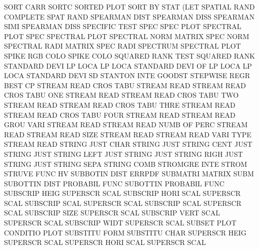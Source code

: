 SORT     CARR                           SORTC
SORTED   PLOT                           SORT     BY   STAT (LET
SPATIAL  RAND                           COMPLETE SPAT RAND
SPEARMAN DIST                           SPEARMAN DISS
SPEARMAN SIMI                           SPEARMAN DISS
SPECIFIC                                TEST     SPEC
SPEC     PLOT                           SPECTRAL PLOT
SPEC                                    SPECTRAL PLOT
SPECTRAL NORM                           MATRIX   SPEC NORM
SPECTRAL RADI                           MATRIX   SPEC RADI
SPECTRUM                                SPECTRAL PLOT
SPIKE    RGB  COLO                      SPIKE    COLO
SQUARED  RANK TEST                      SQUARED  RANK
STANDARD DEVI LP   LOCA                 LP       LOCA
STANDARD DEVI OF   LP   LOCA            LP       LOCA
STANDARD DEVI                           SD
STANTON  INTE                           GOODST
STEPWISE REGR                           BEST     CP
STREAM   READ CROS TABU                 STREAM   READ
STREAM   READ CROS TABU ONE             STREAM   READ
STREAM   READ CROS TABU TWO             STREAM   READ
STREAM   READ CROS TABU THRE            STREAM   READ
STREAM   READ CROS TABU FOUR            STREAM   READ
STREAM   READ GROU VARI                 STREAM   READ
STREAM   READ NUMB OF   PERC            STREAM   READ
STREAM   READ SIZE                      STREAM   READ
STREAM   READ VARI TYPE                 STREAM   READ
STRING   JUST CHAR                      STRING   JUST
STRING   CENT JUST                      STRING   JUST
STRING   LEFT JUST                      STRING   JUST
STRING   RIGH JUST                      STRING   JUST
STRING   SEPA                           STRING   COMB
STROMGRE INTE                           STROM
STRUVE   FUNC                           HV
SUBBOTIN DIST                           ERRPDF
SUBMATRI                                MATRIX   SUBM
SUBOTTIN DIST                           PROBABIL FUNC
SUBOTTIN                                PROBABIL FUNC
SUBSCRIP HEIG                           SUPERSCR SCAL
SUBSCRIP HORI SCAL                      SUPERSCR SCAL
SUBSCRIP SCAL                           SUPERSCR SCAL
SUBSCRIP SCAL                           SUPERSCR SCAL
SUBSCRIP SIZE                           SUPERSCR SCAL
SUBSCRIP VERT SCAL                      SUPERSCR SCAL
SUBSCRIP WIDT                           SUPERSCR SCAL
SUBSET   PLOT                           CONDITIO PLOT
SUBSTITU FORM                           SUBSTITU CHAR
SUPERSCR HEIG                           SUPERSCR SCAL
SUPERSCR HORI SCAL                      SUPERSCR SCAL
